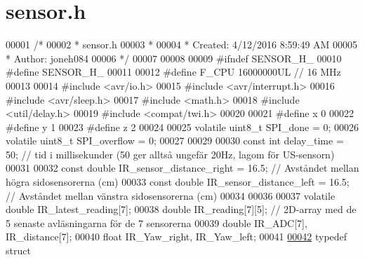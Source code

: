 \hypertarget{sensor_2sensor_2sensor_8h_source}{}\section{sensor.\+h}
\label{sensor_2sensor_2sensor_8h_source}

\begin{DoxyCode}
00001 \textcolor{comment}{/*}
00002 \textcolor{comment}{ * sensor.h}
00003 \textcolor{comment}{ *}
00004 \textcolor{comment}{ * Created: 4/12/2016 8:59:49 AM}
00005 \textcolor{comment}{ *  Author: joneh084}
00006 \textcolor{comment}{ */} 
00007 
00008 
00009 \textcolor{preprocessor}{#ifndef SENSOR\_H\_}
00010 \textcolor{preprocessor}{#define SENSOR\_H\_}
00011 
00012 \textcolor{preprocessor}{#define F\_CPU 16000000UL        // 16 MHz}
00013 
00014 \textcolor{preprocessor}{#include <avr/io.h>}
00015 \textcolor{preprocessor}{#include <avr/interrupt.h>}
00016 \textcolor{preprocessor}{#include <avr/sleep.h>}
00017 \textcolor{preprocessor}{#include <math.h>}
00018 \textcolor{preprocessor}{#include <util/delay.h>}
00019 \textcolor{preprocessor}{#include <compat/twi.h>}
00020 
00021 \textcolor{preprocessor}{#define x 0}
00022 \textcolor{preprocessor}{#define y 1}
00023 \textcolor{preprocessor}{#define z 2}
00024 
00025 \textcolor{keyword}{volatile} uint8\_t SPI\_done = 0;
00026 \textcolor{keyword}{volatile} uint8\_t SPI\_overflow = 0;
00027 
00029 
00030 \textcolor{keyword}{const} \textcolor{keywordtype}{int} delay\_time = 50;                  \textcolor{comment}{// tid i millisekunder (50 ger alltså ungefär 20Hz, lagom för
       US-sensorn)}
00031 
00032 \textcolor{keyword}{const} \textcolor{keywordtype}{double} IR\_sensor\_distance\_right = 16.5;       \textcolor{comment}{// Avståndet mellan högra sidosensorerna (cm)}
00033 \textcolor{keyword}{const} \textcolor{keywordtype}{double} IR\_sensor\_distance\_left = 16.5;        \textcolor{comment}{// Avståndet mellan vänstra sidosensorerna (cm)}
00034 
00036 
00037 \textcolor{keyword}{volatile} \textcolor{keywordtype}{double} IR\_latest\_reading[7];
00038 \textcolor{keywordtype}{double} IR\_reading[7][5];                            \textcolor{comment}{// 2D-array med de 5 senaste avläsningarna för de 7
       sensorerna}
00039 \textcolor{keywordtype}{double} IR\_ADC[7], IR\_distance[7];
00040 \textcolor{keywordtype}{float} IR\_Yaw\_right, IR\_Yaw\_left;                    
00041 
\hypertarget{sensor_2sensor_2sensor_8h_source.tex_l00042}{}\hyperlink{struct_a_d_c__distance__pair}{00042} \textcolor{keyword}{typedef} \textcolor{keyword}{struct}

\end{DoxyCode}
